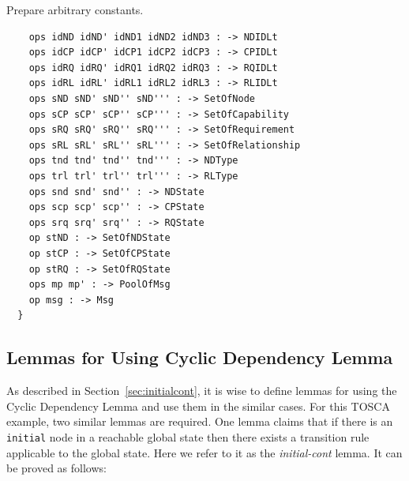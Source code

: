 \documentclass[12pt]{report}
\begin{document}
 Prepare arbitrary constants.
\small
\begin{verbatim}
    ops idND idND' idND1 idND2 idND3 : -> NDIDLt
    ops idCP idCP' idCP1 idCP2 idCP3 : -> CPIDLt
    ops idRQ idRQ' idRQ1 idRQ2 idRQ3 : -> RQIDLt
    ops idRL idRL' idRL1 idRL2 idRL3 : -> RLIDLt
    ops sND sND' sND'' sND''' : -> SetOfNode
    ops sCP sCP' sCP'' sCP''' : -> SetOfCapability
    ops sRQ sRQ' sRQ'' sRQ''' : -> SetOfRequirement
    ops sRL sRL' sRL'' sRL''' : -> SetOfRelationship
    ops tnd tnd' tnd'' tnd''' : -> NDType
    ops trl trl' trl'' trl''' : -> RLType
    ops snd snd' snd'' : -> NDState
    ops scp scp' scp'' : -> CPState
    ops srq srq' srq'' : -> RQState
    op stND : -> SetOfNDState
    op stCP : -> SetOfCPState
    op stRQ : -> SetOfRQState
    ops mp mp' : -> PoolOfMsg
    op msg : -> Msg
  }
\end{verbatim}
\normalsize

\subsection{Lemmas for Using Cyclic Dependency Lemma}
\label{sec:TOSCAcont}
As described in Section~\ref{sec:initialcont}, it is wise to define
lemmas for using the Cyclic Dependency Lemma and use them in the
similar cases. For this TOSCA example, two similar lemmas are
required. One lemma claims that if there is an {\tt initial} node in a
reachable global state then there exists a transition rule applicable to the
global state. Here we refer to it as the {\it initial-cont} lemma. It
can be proved as follows:\\
\end{document}
